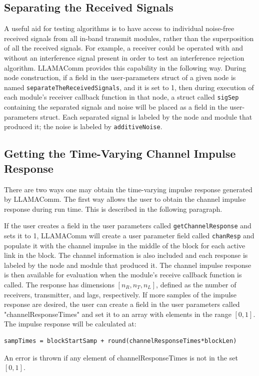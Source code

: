 \subsection{Separating the Received Signals}
A useful aid for testing algorithms is to have access to individual noise-free received signals from all in-band transmit modules, rather than the superposition of all the received signals.  For example, a receiver could be operated with and without an interference signal present in order to test an interference rejection algorithm.  LLAMAComm provides this capability in the following way.  During node construction, if a field in the user-parameters struct of a given node is named \verb+separateTheReceivedSignals+, and it is set to 1, then during execution of each module's receiver callback function in that node, a struct called \verb+sigSep+ containing the separated signals and noise will be placed as a field in the user-parameters struct.  Each separated signal is labeled by the node and module that produced it; the noise is labeled by \verb+additiveNoise+.

\subsection{Getting the Time-Varying Channel Impulse Response}
There are two ways one may obtain the time-varying impulse response generated by LLAMAComm.   The first way allows the user to obtain the channel impulse response during run time.  This is described in the following paragraph.

If the user creates a field in the user parameters called \verb+getChannelResponse+ and sets it to 1, LLAMAComm will create a user parameter field called \verb+chanResp+ and populate it with the channel impulse in the middle of the block for each active link in the block.  The channel information is also included and each response is labeled by the node and module that produced it.  The channel impulse response is then available for evaluation when the module's receive callback function is called.  The response has dimensions $[n_R, n_T, n_L]$, defined as the number of receivers, transmitter, and lags, respectively.  If more samples of the impulse response are desired, the user can create a field in the user parameters called "channelResponseTimes" and set it to an array with elements in the range $[0,1]$.  The impulse response will be calculated at:
%
\begin{lstlisting}[numbers=none]
  sampTimes = blockStartSamp + round(channelResponseTimes*blockLen)
\end{lstlisting}
%
 An error is thrown if any element of channelResponseTimes is not in the set $[0,1]$.



